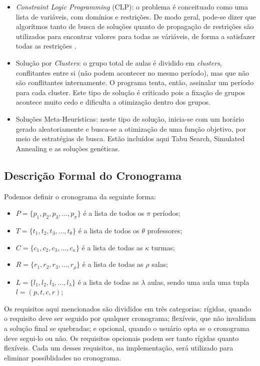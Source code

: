 \documentclass[12pt,a4paper]{article}
\begin{document}
		\begin{itemize}
			\item \textit{Constraint Logic Programming} (CLP): o problema é conceituado como uma lista de variáveis, com domínios e restrições. \cite{badoni} De modo geral, pode-se dizer que algorítmos tanto de busca de soluções quanto de propagação de restrições são utilizados para encontrar valores para todas as váriáveis, de forma a satisfazer todas as restrições \cite{citar_alguém}.
			\item Solução por \textit{Clusters}: o grupo total de aulas é dividido em \textit{clusters}, conflitantes entre si (não podem acontecer no mesmo período), mas que não são conflitantes internamente. O programa tenta, então, assinalar um período para cada cluster. Este tipo de solução é criticado pois a fixação de grupos acontece muito cedo e dificulta a otimização dentro dos grupos. \cite{muller}
			\item Soluções Meta-Heurísticas: neste tipo de solução, inicia-se com um horário gerado aleatoriamente e busca-se a otimização de uma função objetivo, por meio de estratégias de busca. Estão incluídos aqui Tabu Search, Simulated Annealing e as soluções genéticas.
		\end{itemize}

		\subsection{Descrição Formal do Cronograma}

			\par Podemos definir o cronograma da seguinte forma:

			\begin{itemize}
				\item $P = \{p_1, p_2, p_3, ..., p_\pi\}$ é a lista de todos os $\pi$ períodos;
				\item $T = \{t_1, t_2, t_3, ..., t_\theta\}$ é a lista de todos os $\theta$ professores;
				\item $C = \{c_1, c_2, c_3, ..., c_\kappa\} $ é a lista de todas as $\kappa$ turmas;
				\item $R = \{r_1, r_2, r_3, ..., r_\rho\}$ é a lista de todas as $\rho$ salas;
				\item $L = \{l_1, l_2, l_3, ..., l_\lambda\}$ é a lista de todas as $\lambda$ aulas, sendo uma aula uma tupla $l = (p,t,c,r)$;
			\end{itemize}

			\par Os requisitos aqui mencionados são divididos em três categorias: rígidas, quando o requisito deve ser seguido por qualquer cronograma; flexíveis, que não invalidam a solução final se quebradas; e opcional, quando o usuário opta se o cronograma deve segui-lo ou não. Os requisitos opcionais podem ser tanto rígidas quanto flexíveis. Cada um desses requisitos, na implementação, será utilizado para eliminar possiblidades no cronograma.
\end{document}
